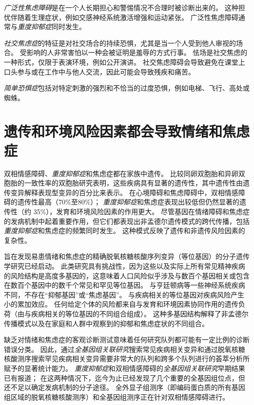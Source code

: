 \textit{广泛性焦虑障碍}是在一个人长期担心和警惕情况不合理时被诊断出来的。
这种担忧伴随着生理症状，例如交感神经系统激活增强和运动紧张。
广泛性焦虑障碍通常与\textit{重度抑郁症}同时发生。


\textit{社交焦虑症}的特征是对社交场合的持续恐惧，尤其是当一个人受到他人审视的场合。
受影响的人非常害怕以一种会被证明是羞辱的方式行事。
怯场是社交焦虑的一种形式，仅限于表演环境，例如公开演讲。
社交焦虑障碍会导致避免在课堂上口头参与或在工作中与他人交流，因此可能会导致残疾和痛苦。



\textit{简单恐惧症}包括对特定刺激的强烈和不恰当的过度恐惧，例如电梯、飞行、高处或蜘蛛。



\section{遗传和环境风险因素都会导致情绪和焦虑症}

双相情感障碍、\textit{重度抑郁症}和焦虑症都在家族中遗传。
比较同卵双胞胎和异卵双胞胎的一致性率的双胞胎研究表明，这些疾病具有显著的遗传性，其中遗传性由遗传变异解释表现型变异的百分比来表示。
在心境障碍和焦虑障碍中，双相情感障碍的遗传性最高（70\%至80\%）；
\textit{重度抑郁症}和焦虑症表现出较低但仍然显著的遗传性（约 35\%），发育和环境风险因素的作用更大。
尽管基因在情绪障碍和焦虑症的发病机制中起着重要作用，但它们都表现出非孟德尔遗传模式的跨代传播，包括\textit{重度抑郁症}和焦虑症的频繁同时发生。
这种模式反映了遗传和非遗传风险因素的复杂性。


旨在发现易患情绪和焦虑症的精确脱氧核糖核酸序列变异（等位基因）的分子遗传学研究已经启动。
此类研究具有挑战性，因为这些以及实际上所有常见精神疾病的风险结构是高度多基因的，这意味着人口风险似乎涉及与数百个基因相关或包含在数百个基因中的数千个常见和罕见等位基因。
与亨廷顿病等一些神经系统疾病不同，不存在“抑郁基因”或“焦虑基因”。
与疾病相关的等位基因对疾病风险产生小的累加效应。
任何给定个体的风险都来自与发育和环境因素协同作用的遗传负荷（由与疾病相关的等位基因的不同组合组成）。
这种多基因结构解释了非孟德尔传播模式以及在家庭和人群中观察到的抑郁和焦虑症状的不同组合。


缺乏对情绪和焦虑症的客观诊断测试意味着任何研究队列都可能有一定比例的诊断错误分类。
因此，通过\textit{全基因组关联研究}搜索常见疾病相关变异和通过脱氧核糖核酸测序搜索罕见疾病相关变异需要非常大的队列和跨多个队列进行的荟萃分析所赋予的显著统计能力。
\textit{重度抑郁症}和双相情感障碍的\textit{全基因组关联研究}早期结果已有报道；
在这两种情况下，迄今为止已经发现了几个重要的全基因组位点，但还不足以确定发病机制的分子途径。
全外显子组测序（即编码蛋白质的所有基因组区域的脱氧核糖核酸测序）和全基因组测序正在针对双相情感障碍进行。


